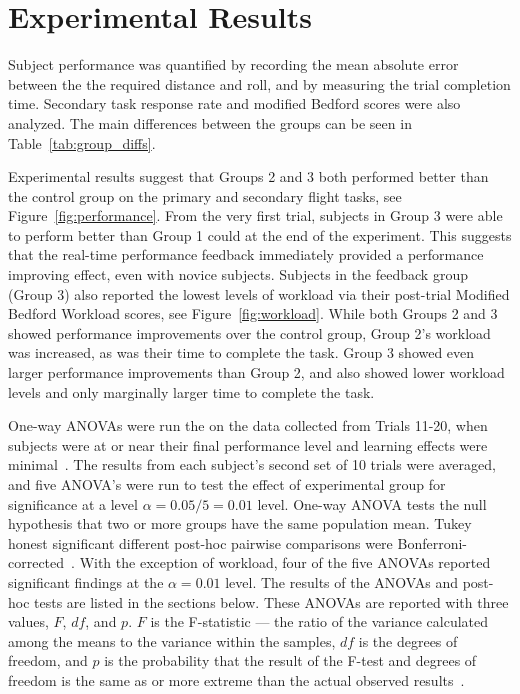 \documentclass[]{aiaa-tc}%
\begin{document}
\section{Experimental Results}
Subject performance was quantified by recording the mean absolute error between the the required distance and roll, and by measuring the trial completion time. Secondary task response rate and modified Bedford scores were also analyzed. The main differences between the groups can be seen in Table~\ref{tab:group_diffs}.

Experimental results suggest that Groups 2 and 3 both performed better than the control group on the primary and secondary flight tasks, see Figure~\ref{fig:performance}. From the very first trial, subjects in Group 3 were able to perform better than Group 1 could at the end of the experiment. This suggests that the real-time performance feedback immediately provided a performance improving effect, even with novice subjects. Subjects in the feedback group (Group 3) also reported the lowest levels of workload via their post-trial Modified Bedford Workload scores, see Figure~\ref{fig:workload}. While both Groups 2 and 3 showed performance improvements over the control group, Group 2's workload was increased, as was their time to complete the task. Group 3 showed even larger performance improvements than Group 2, and also showed lower workload levels and only marginally larger time to complete the task.

One-way ANOVAs were run the on the data collected from Trials 11-20, when subjects were at or near their final performance level and learning effects were minimal~\cite{fisher1925statistical}. The results from each subject's second set of 10 trials were averaged, and five ANOVA's were run to test the effect of experimental group for significance at a level $\alpha = 0.05/5 = 0.01$ level. One-way ANOVA tests the null hypothesis that two or more groups have the same population mean. Tukey honest significant different post-hoc pairwise comparisons were Bonferroni-corrected~\cite{tukey1949comparing}. With the exception of workload, four of the five ANOVAs reported significant findings at the $\alpha = 0.01$ level. The results of the ANOVAs and post-hoc tests are listed in the sections below. These ANOVAs are reported with three values, $F$, $df$, and $p$. $F$ is the F-statistic --- the ratio of the variance calculated among the means to the variance within the samples, $df$ is the degrees of freedom, and $p$ is the probability that the result of the F-test and degrees of freedom is the same as or more extreme than the actual observed results~\cite{wasserstein2016asa}.
\end{document}
